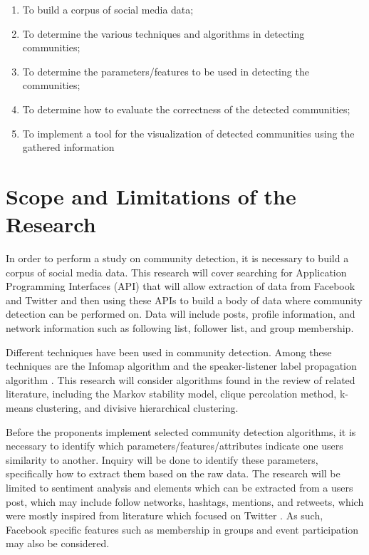 \begin{enumerate}
	\item To build a corpus of social media data;
	\item To determine the various techniques and algorithms in detecting communities;
	\item To determine the parameters/features to be used in detecting the communities;
	\item To determine how to evaluate the correctness of the detected communities;
	\item To implement a tool for the visualization of detected communities using the gathered information
\end{enumerate}

\section{Scope and Limitations of the Research}
\label{sec:scopelimitations}

In order to perform a study on community detection, it is necessary to build a corpus of social media data. This research will cover searching for Application Programming Interfaces (API) that will allow extraction of data from Facebook and Twitter and then using these APIs to build a body of data where community detection can be performed on. Data will include posts, profile information, and network information such as following list, follower list, and group membership.

Different techniques have been used in community detection. Among these techniques are the Infomap algorithm and the speaker-listener label propagation algorithm \cite{Deitrick:2013}.  This research will consider algorithms found in the review of related literature, including the Markov stability model, clique percolation method, k-means clustering, and divisive hierarchical clustering.

Before the proponents implement selected community detection algorithms, it is necessary to identify which parameters/features/attributes indicate one user\vtick s similarity to another. Inquiry will be done to identify these parameters, specifically how to extract them based on the raw data. The research will be limited to sentiment analysis and elements which can be extracted from a user\vtick s post, which may include follow networks, hashtags, mentions, and retweets, which were mostly inspired from literature which focused on Twitter \cite{Deitrick:2013,Zhang:2012,Lim:2012:1}. As such, Facebook specific features such as membership in groups and event participation may also be considered.

